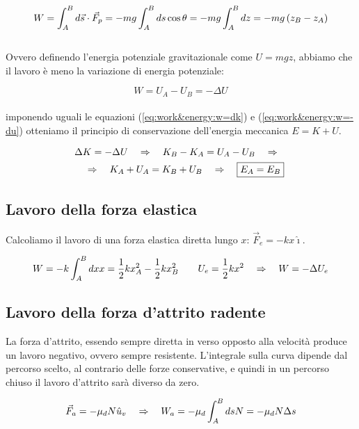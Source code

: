\begin{equation}
    W = \int_A^Bd\vec s \cdot\vec F_p = -mg\int_A^Bds\cos\theta =
    -mg\int_A^Bdz = -mg\left( z_B-z_A\right)
\end{equation}
\\
Ovvero definendo l'energia potenziale gravitazionale come $U = mgz$, abbiamo
che il lavoro è meno la variazione di energia potenziale:

\begin{equation}
    W = U_A-U_B = -\Delta U
\label{eq:work&energy:w=-du}
\end{equation}
\\
imponendo uguali le equazioni (\ref{eq:work&energy:w=dk}) e (\ref{eq:work&energy:w=-du})
otteniamo il principio di conservazione dell'energia meccanica $E = K + U$.

\begin{multline}
    \Delta K = -\Delta U\quad\Rightarrow\quad K_B-K_A = U_A -U_B\quad\Rightarrow\quad
    \\\quad\Rightarrow\quad K_A+U_A = K_B+U_B\quad\Rightarrow\quad
    \boxed{E_A = E_B}
\end{multline}

\subsection{Lavoro della forza elastica}
Calcoliamo il lavoro di una forza elastica diretta lungo
$x$: $\vec F_e = -kx\hat\imath$.

\begin{equation}
    W = -k\int_A^Bdx x = \frac12 kx_A^2-\frac12 kx^2_B\quad\quad
    U_e = \frac12 kx^2\quad\Rightarrow\quad W = -\Delta U_e
\label{eq:work&energy:elastic_energy}
\end{equation}

\subsection{Lavoro della forza d'attrito radente}
La forza d'attrito, essendo sempre diretta in verso opposto alla velocità
produce un lavoro negativo, ovvero sempre resistente. L'integrale sulla
curva dipende dal percorso scelto, al contrario delle forze conservative,
e quindi in un percorso chiuso il lavoro d'attrito sarà diverso da zero.

\begin{equation}
    \vec F_a = -\mu_d N \hat u_v\quad\Rightarrow\quad W_a = -\mu_d\int_A^BdsN =
    -\mu_dN\Delta s
    \label{eq:work&energy:work_friction}
\end{equation}

